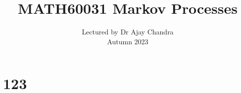 \documentclass{article}
\title{MATH60031 Markov Processes}
\author{Lectured by Dr Ajay Chandra\\
Autumn 2023\\
}
\date{}
\numberwithin{equation}{section}
\theoremstyle{definition}
\begin{document}
\maketitle


\section{123}
\end{document}
